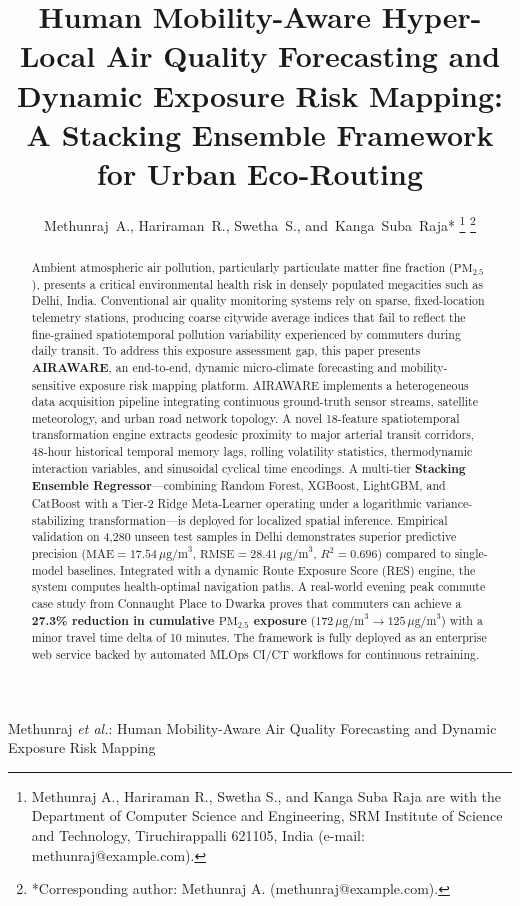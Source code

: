 \documentclass[journal]{IEEEtran}
\begin{document}
\title{Human Mobility-Aware Hyper-Local Air Quality Forecasting and Dynamic Exposure Risk Mapping: A Stacking Ensemble Framework for Urban Eco-Routing}

\author{Methunraj~A.,
        Hariraman~R.,
        Swetha~S.,
        and~Kanga~Suba~Raja*%
\thanks{Methunraj A., Hariraman R., Swetha S., and Kanga Suba Raja are with the Department of Computer Science and Engineering, SRM Institute of Science and Technology, Tiruchirappalli 621105, India (e-mail: methunraj@example.com).}
\thanks{*Corresponding author: Methunraj A. (methunraj@example.com).}
}

%
{Methunraj \MakeLowercase{\textit{et al.}}: Human Mobility-Aware Air Quality Forecasting and Dynamic Exposure Risk Mapping}

\maketitle

\begin{abstract}
Ambient atmospheric air pollution, particularly particulate matter fine fraction ($\text{PM}_{2.5}$), presents a critical environmental health risk in densely populated megacities such as Delhi, India. Conventional air quality monitoring systems rely on sparse, fixed-location telemetry stations, producing coarse citywide average indices that fail to reflect the fine-grained spatiotemporal pollution variability experienced by commuters during daily transit. To address this exposure assessment gap, this paper presents \textbf{AIRAWARE}, an end-to-end, dynamic micro-climate forecasting and mobility-sensitive exposure risk mapping platform. AIRAWARE implements a heterogeneous data acquisition pipeline integrating continuous ground-truth sensor streams, satellite meteorology, and urban road network topology. A novel 18-feature spatiotemporal transformation engine extracts geodesic proximity to major arterial transit corridors, 48-hour historical temporal memory lags, rolling volatility statistics, thermodynamic interaction variables, and sinusoidal cyclical time encodings. A multi-tier \textbf{Stacking Ensemble Regressor}---combining Random Forest, XGBoost, LightGBM, and CatBoost with a Tier-2 Ridge Meta-Learner operating under a logarithmic variance-stabilizing transformation---is deployed for localized spatial inference. Empirical validation on 4,280 unseen test samples in Delhi demonstrates superior predictive precision ($\text{MAE} = 17.54\,\mu\text{g/m}^3$, $\text{RMSE} = 28.41\,\mu\text{g/m}^3$, $R^2 = 0.696$) compared to single-model baselines. Integrated with a dynamic Route Exposure Score (RES) engine, the system computes health-optimal navigation paths. A real-world evening peak commute case study from Connaught Place to Dwarka proves that commuters can achieve a \textbf{27.3\% reduction in cumulative $\text{PM}_{2.5}$ exposure} ($172\,\mu\text{g/m}^3 \to 125\,\mu\text{g/m}^3$) with a minor travel time delta of 10 minutes. The framework is fully deployed as an enterprise web service backed by automated MLOps CI/CT workflows for continuous retraining.
\end{abstract}
\end{document}
